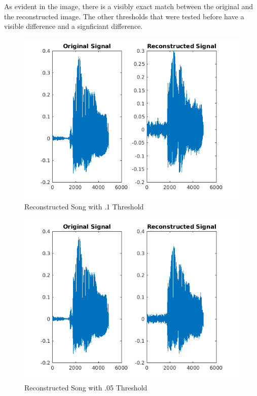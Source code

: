 \documentclass[11pt, a4paper]{article}
\begin{document}
As evident in the image, there is a visibly exact match between the original and the reconstructed image. The other thresholds that were tested before have a visible difference and a signficiant difference. 


\begin{figure}[H]
\hspace*{-2cm}    
    \centering
    \includegraphics[width=\textwidth]{ReconstructedImage64.png}
    \caption{Reconstructed Song with .1 Threshold}
\end{figure}


\begin{figure}[H]
\hspace*{-2cm}    
    \centering
    \includegraphics[width=\textwidth]{ReconstructedImage76.png}
    \caption{Reconstructed Song with .05 Threshold}
\end{figure}
\end{document}
